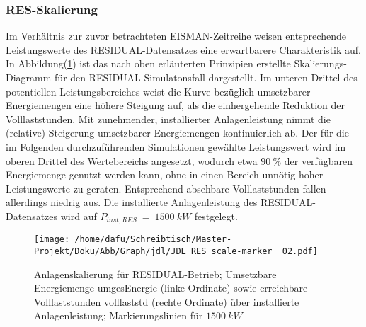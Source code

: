 \documentclass[onecolumn,10pt,titlepage]{article}
\begin{document}
\subsubsection{RES-Skalierung}
Im Verhältnis zur zuvor betrachteten EISMAN-Zeitreihe weisen entsprechende Leistungswerte des RESIDUAL-Datensatzes eine erwartbarere Charakteristik auf. In Abbildung(\ref{fig:Skal_RES}) ist das nach oben erläuterten Prinzipien erstellte Skalierungs-Diagramm für den RESIDUAL-Simulatonsfall dargestellt. Im unteren Drittel des potentiellen Leistungsbereiches weist die Kurve bezüglich umsetzbarer Energiemengen eine höhere Steigung auf, als die einhergehende Reduktion der Volllaststunden. Mit zunehmender, installierter Anlagenleistung nimmt die (relative) Steigerung umsetzbarer Energiemengen kontinuierlich ab. Der für die im Folgenden durchzuführenden Simulationen gewählte Leistungswert wird im oberen Drittel des Wertebereichs angesetzt, wodurch etwa $90~\%$ der verfügbaren Energiemenge genutzt werden kann, ohne in einen Bereich unnötig hoher Leistungswerte zu geraten. Entsprechend absehbare Volllaststunden fallen allerdings niedrig aus.
Die installierte Anlagenleistung des RESIDUAL-Datensatzes wird auf $P_{inst,RES} ~=~1500~kW$ festgelegt.
\begin{figure}[H]
	
	\centering
	\texttt{[image: /home/dafu/Schreibtisch/Master-Projekt/Doku/Abb/Graph/jdl/JDL\_RES\_scale-marker\_\_02.pdf]}
	\caption[Anlagenskalierung für RESIDUAL-Betrieb]{Anlagenskalierung für RESIDUAL-Betrieb; Umsetzbare Energiemenge \gls{umgesEnergie} (linke Ordinate) sowie erreichbare Volllaststunden \gls{volllaststd} (rechte Ordinate) über installierte Anlagenleistung; Markierungslinien für $1500~kW$}
	\label{fig:Skal_RES} 
\end{figure}
\newpage
\end{document}
